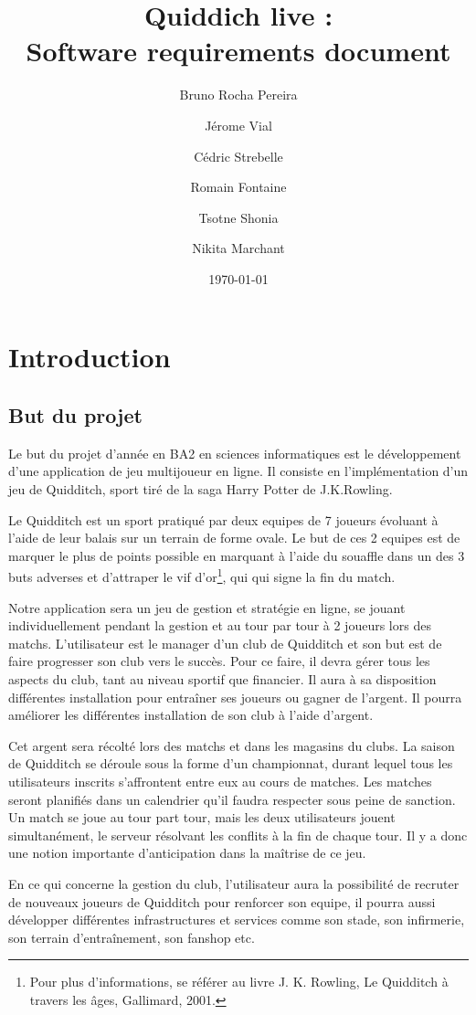 \documentclass[a4paper]{article}
\title{Quiddich live : \\Software requirements document}
\author{Bruno Rocha Pereira \and Jérome Vial \and Cédric Strebelle \and
Romain Fontaine \and Tsotne Shonia \and Nikita Marchant}
\date{\today}
\begin{document}
\maketitle

\section{Introduction}
\subsection{But du projet}
Le but du projet d'année en BA2 en sciences informatiques est le développement d'une application de jeu multijoueur en ligne.
Il consiste en l'implémentation d'un jeu de Quidditch, sport tiré de la saga Harry Potter de J.K.Rowling.

 
Le Quidditch est un sport pratiqué par deux \glspl{equipe} de 7 \glspl{joueur} évoluant à l'aide de leur balais sur un terrain de forme ovale. Le but de ces 2 \glspl{equipe} est de marquer le plus de points possible en marquant à l'aide du souaffle dans un des 3 buts adverses et d'attraper le vif d'or\footnote{Pour plus d'informations, se référer au livre J. K. Rowling, Le Quidditch à travers les âges, Gallimard, 2001.}, qui qui signe la fin du match. 


Notre application sera un jeu de gestion et stratégie en ligne, se jouant individuellement pendant la gestion et au tour par tour à 2 joueurs lors des matchs. L'\gls{utilisateur} est le \gls{manager} d'un \gls{club} de Quidditch et son but est de faire progresser son \gls{club} vers le succès. Pour ce faire, il devra gérer tous les aspects du \gls{club}, tant au niveau sportif que financier. Il aura à sa disposition différentes installation pour entraîner ses \glspl{joueur} ou gagner de l'argent. Il pourra améliorer les différentes installation de son \gls{club} à l'aide d'argent.

Cet argent sera récolté lors des matchs et dans les magasins du \glspl{club}. La saison de Quidditch se déroule sous la forme d'un championnat, durant lequel tous les \glspl{utilisateur} inscrits s'affrontent entre eux au cours de matches. Les matches seront planifiés dans un calendrier qu'il faudra respecter sous peine de sanction. Un match se joue au tour part tour, mais les deux \glspl{utilisateur} jouent simultanément, le \gls{serveur} résolvant les conflits à la fin de chaque tour. Il y a donc une notion importante d'anticipation dans la maîtrise de ce jeu.

En ce qui concerne la gestion du \gls{club}, l'\gls{utilisateur} aura la possibilité de recruter de nouveaux \glspl{joueur} de Quidditch pour renforcer son \gls{equipe}, il pourra aussi développer différentes infrastructures et services comme son stade, son infirmerie, son terrain d'entraînement, son fanshop etc.
\end{document}
